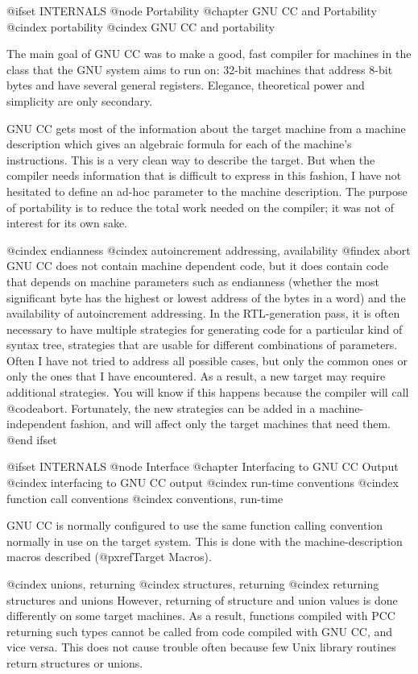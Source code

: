 @ifset INTERNALS
@node Portability
@chapter GNU CC and Portability
@cindex portability
@cindex GNU CC and portability

The main goal of GNU CC was to make a good, fast compiler for machines in
the class that the GNU system aims to run on: 32-bit machines that address
8-bit bytes and have several general registers.  Elegance, theoretical
power and simplicity are only secondary.

GNU CC gets most of the information about the target machine from a machine
description which gives an algebraic formula for each of the machine's
instructions.  This is a very clean way to describe the target.  But when
the compiler needs information that is difficult to express in this
fashion, I have not hesitated to define an ad-hoc parameter to the machine
description.  The purpose of portability is to reduce the total work needed
on the compiler; it was not of interest for its own sake.

@cindex endianness
@cindex autoincrement addressing, availability
@findex abort
GNU CC does not contain machine dependent code, but it does contain code
that depends on machine parameters such as endianness (whether the most
significant byte has the highest or lowest address of the bytes in a word)
and the availability of autoincrement addressing.  In the RTL-generation
pass, it is often necessary to have multiple strategies for generating code
for a particular kind of syntax tree, strategies that are usable for different
combinations of parameters.  Often I have not tried to address all possible
cases, but only the common ones or only the ones that I have encountered.
As a result, a new target may require additional strategies.  You will know
if this happens because the compiler will call @code{abort}.  Fortunately,
the new strategies can be added in a machine-independent fashion, and will
affect only the target machines that need them.
@end ifset

@ifset INTERNALS
@node Interface
@chapter Interfacing to GNU CC Output
@cindex interfacing to GNU CC output
@cindex run-time conventions
@cindex function call conventions
@cindex conventions, run-time

GNU CC is normally configured to use the same function calling convention
normally in use on the target system.  This is done with the
machine-description macros described (@pxref{Target Macros}).

@cindex unions, returning
@cindex structures, returning
@cindex returning structures and unions
However, returning of structure and union values is done differently on
some target machines.  As a result, functions compiled with PCC
returning such types cannot be called from code compiled with GNU CC,
and vice versa.  This does not cause trouble often because few Unix
library routines return structures or unions.

